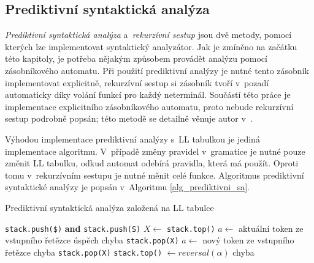 \subsection*{Prediktivní syntaktická analýza}
\emph{Prediktivní syntaktická analýza} a~\emph{rekurzívní sestup} jsou dvě metody, pomocí kterých lze implementovat syntaktický analyzátor.
Jak je zmíněno na začátku této kapitoly, je potřeba nějakým způsobem provádět analýzu pomocí zásobníkového automatu.
Při použití prediktivní analýzy je nutné tento zásobník implementovat explicitně, rekurzívní sestup si zásobník tvoří v~pozadí automaticky díky volání funkcí pro každý neterminál.
Součástí této práce je implementace explicitního zásobníkového automatu, proto nebude rekurzívní sestup podrobně popsán; této metodě se detailně věnuje autor v~\cite{medunaElementsOfCompDesign}.

Výhodou implementace prediktivní analýzy s~LL tabulkou je jediná implementace algoritmu.
V~případě změny pravidel v~gramatice je nutné pouze změnit LL tabulku, odkud automat odebírá pravidla, která má použít.
Oproti tomu v~rekurzívním sestupu je nutné měnit celé funkce.
Algoritmus prediktivní syntaktické analýzy je popsán v~Algoritmu \ref{alg_prediktivni_sa}.
\begin{algorithm}[ht]
    \caption{Prediktivní syntaktická analýza založená na LL tabulce}
    \label{alg_prediktivni_sa}
    \begin{algorithmic}[1]
        \NewLine
        \State \texttt{stack.push(\$)} \textbf{and} \texttt{stack.push(S)}
        \Repeat
            \State $X \gets$ \texttt{stack.top()}
            \State $a \gets$ aktuální token ze vstupního řetězce
                \Case{\$}
                        \State úspěch
                    \Else 
                        \State chyba
                    \EndIf
                \EndCase
                        \State \texttt{stack.pop(X)}
                        \State $a \gets$ nový token ze vstupního řetězce
                    \Else
                        \State chyba
                    \EndIf
                \EndCase
                        \State \texttt{stack.pop(X)}
                        \State \texttt{stack.top()} $\gets reversal(\alpha)$
                    \Else
                        \State chyba
                    \EndIf
                \EndCase
            \EndSwitch                
    \end{algorithmic}
\end{algorithm}

